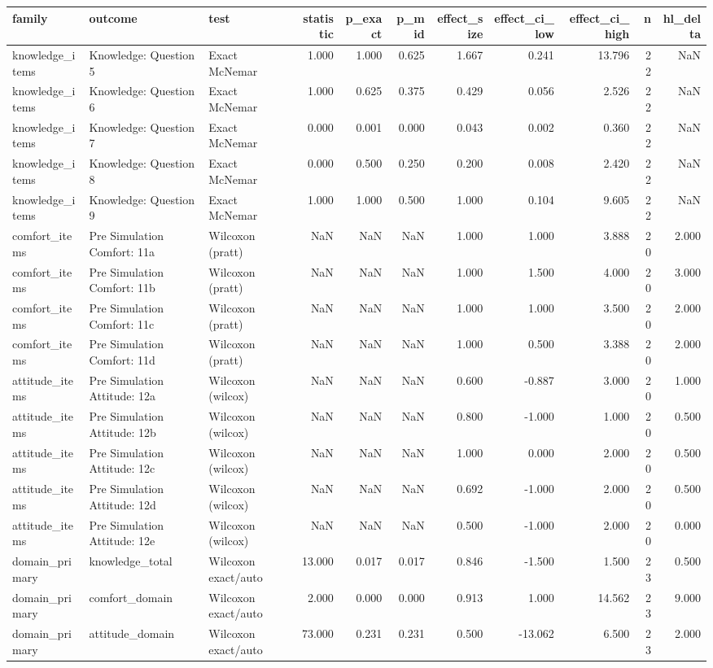 \begin{tabular}{lllrrrrrrrr}
\toprule
family & outcome & test & statistic & p_exact & p_mid & effect_size & effect_ci_low & effect_ci_high & n & hl_delta \\
\midrule
knowledge_items & Knowledge: Question 5 & Exact McNemar & 1.000 & 1.000 & 0.625 & 1.667 & 0.241 & 13.796 & 22 & NaN \\
knowledge_items & Knowledge: Question 6 & Exact McNemar & 1.000 & 0.625 & 0.375 & 0.429 & 0.056 & 2.526 & 22 & NaN \\
knowledge_items & Knowledge: Question 7 & Exact McNemar & 0.000 & 0.001 & 0.000 & 0.043 & 0.002 & 0.360 & 22 & NaN \\
knowledge_items & Knowledge: Question 8 & Exact McNemar & 0.000 & 0.500 & 0.250 & 0.200 & 0.008 & 2.420 & 22 & NaN \\
knowledge_items & Knowledge: Question 9 & Exact McNemar & 1.000 & 1.000 & 0.500 & 1.000 & 0.104 & 9.605 & 22 & NaN \\
comfort_items & Pre Simulation Comfort: 11a & Wilcoxon (pratt) & NaN & NaN & NaN & 1.000 & 1.000 & 3.888 & 20 & 2.000 \\
comfort_items & Pre Simulation Comfort: 11b & Wilcoxon (pratt) & NaN & NaN & NaN & 1.000 & 1.500 & 4.000 & 20 & 3.000 \\
comfort_items & Pre Simulation Comfort: 11c & Wilcoxon (pratt) & NaN & NaN & NaN & 1.000 & 1.000 & 3.500 & 20 & 2.000 \\
comfort_items & Pre Simulation Comfort: 11d & Wilcoxon (pratt) & NaN & NaN & NaN & 1.000 & 0.500 & 3.388 & 20 & 2.000 \\
attitude_items & Pre Simulation Attitude: 12a & Wilcoxon (wilcox) & NaN & NaN & NaN & 0.600 & -0.887 & 3.000 & 20 & 1.000 \\
attitude_items & Pre Simulation Attitude: 12b & Wilcoxon (wilcox) & NaN & NaN & NaN & 0.800 & -1.000 & 1.000 & 20 & 0.500 \\
attitude_items & Pre Simulation Attitude: 12c & Wilcoxon (wilcox) & NaN & NaN & NaN & 1.000 & 0.000 & 2.000 & 20 & 0.500 \\
attitude_items & Pre Simulation Attitude: 12d & Wilcoxon (wilcox) & NaN & NaN & NaN & 0.692 & -1.000 & 2.000 & 20 & 0.500 \\
attitude_items & Pre Simulation Attitude: 12e & Wilcoxon (wilcox) & NaN & NaN & NaN & 0.500 & -1.000 & 2.000 & 20 & 0.000 \\
domain_primary & knowledge_total & Wilcoxon exact/auto & 13.000 & 0.017 & 0.017 & 0.846 & -1.500 & 1.500 & 23 & 0.500 \\
domain_primary & comfort_domain & Wilcoxon exact/auto & 2.000 & 0.000 & 0.000 & 0.913 & 1.000 & 14.562 & 23 & 9.000 \\
domain_primary & attitude_domain & Wilcoxon exact/auto & 73.000 & 0.231 & 0.231 & 0.500 & -13.062 & 6.500 & 23 & 2.000 \\
\bottomrule
\end{tabular}
